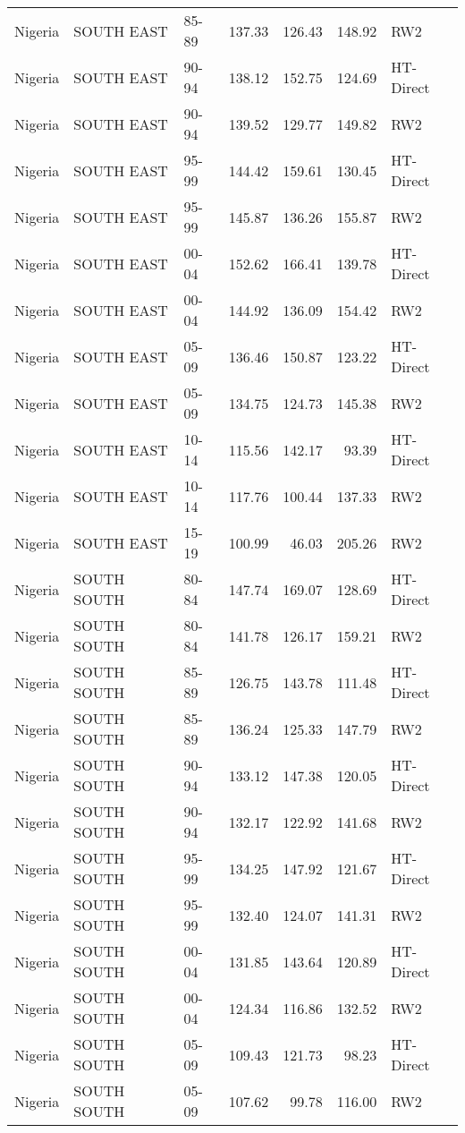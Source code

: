 \begin{longtable}{lllrrrl}
  Nigeria & SOUTH EAST & 85-89 & 137.33 & 126.43 & 148.92 & RW2 \\ 
  Nigeria & SOUTH EAST & 90-94 & 138.12 & 152.75 & 124.69 & HT-Direct \\ 
  Nigeria & SOUTH EAST & 90-94 & 139.52 & 129.77 & 149.82 & RW2 \\ 
  Nigeria & SOUTH EAST & 95-99 & 144.42 & 159.61 & 130.45 & HT-Direct \\ 
  Nigeria & SOUTH EAST & 95-99 & 145.87 & 136.26 & 155.87 & RW2 \\ 
  Nigeria & SOUTH EAST & 00-04 & 152.62 & 166.41 & 139.78 & HT-Direct \\ 
  Nigeria & SOUTH EAST & 00-04 & 144.92 & 136.09 & 154.42 & RW2 \\ 
  Nigeria & SOUTH EAST & 05-09 & 136.46 & 150.87 & 123.22 & HT-Direct \\ 
  Nigeria & SOUTH EAST & 05-09 & 134.75 & 124.73 & 145.38 & RW2 \\ 
  Nigeria & SOUTH EAST & 10-14 & 115.56 & 142.17 & 93.39 & HT-Direct \\ 
  Nigeria & SOUTH EAST & 10-14 & 117.76 & 100.44 & 137.33 & RW2 \\ 
  Nigeria & SOUTH EAST & 15-19 & 100.99 & 46.03 & 205.26 & RW2 \\ 
  Nigeria & SOUTH SOUTH & 80-84 & 147.74 & 169.07 & 128.69 & HT-Direct \\ 
  Nigeria & SOUTH SOUTH & 80-84 & 141.78 & 126.17 & 159.21 & RW2 \\ 
  Nigeria & SOUTH SOUTH & 85-89 & 126.75 & 143.78 & 111.48 & HT-Direct \\ 
  Nigeria & SOUTH SOUTH & 85-89 & 136.24 & 125.33 & 147.79 & RW2 \\ 
  Nigeria & SOUTH SOUTH & 90-94 & 133.12 & 147.38 & 120.05 & HT-Direct \\ 
  Nigeria & SOUTH SOUTH & 90-94 & 132.17 & 122.92 & 141.68 & RW2 \\ 
  Nigeria & SOUTH SOUTH & 95-99 & 134.25 & 147.92 & 121.67 & HT-Direct \\ 
  Nigeria & SOUTH SOUTH & 95-99 & 132.40 & 124.07 & 141.31 & RW2 \\ 
  Nigeria & SOUTH SOUTH & 00-04 & 131.85 & 143.64 & 120.89 & HT-Direct \\ 
  Nigeria & SOUTH SOUTH & 00-04 & 124.34 & 116.86 & 132.52 & RW2 \\ 
  Nigeria & SOUTH SOUTH & 05-09 & 109.43 & 121.73 & 98.23 & HT-Direct \\ 
  Nigeria & SOUTH SOUTH & 05-09 & 107.62 & 99.78 & 116.00 & RW2 \\ 

\end{longtable}
